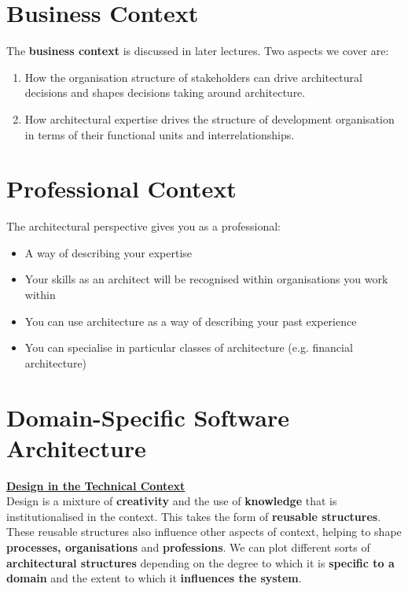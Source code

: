 \documentclass[a4paper]{report}
\begin{document}
\section{Business Context}
The \textbf{business context} is discussed in later lectures. Two aspects we cover are:
\begin{enumerate}
\item How the organisation structure of stakeholders can drive architectural decisions and shapes decisions taking around architecture.
\item How architectural expertise drives the structure of development organisation in terms of their functional units and interrelationships.
\end{enumerate}
\section{Professional Context}
The architectural perspective gives you as a professional:
\begin{itemize}
\item A way of describing your expertise
\item Your skills as an architect will be recognised within organisations you work within
\item You can use architecture as a way of describing your past experience
\item You can specialise in particular classes of architecture (e.g. financial architecture)
\end{itemize}
\section{Domain-Specific Software Architecture}

\underline{\textbf{Design in the Technical Context}}\\
Design is a mixture of \textbf{creativity} and the use of \textbf{knowledge} that is institutionalised in the context. This takes the form of \textbf{reusable structures}. These reusable structures also influence other aspects of context, helping to shape \textbf{processes, organisations} and \textbf{professions}. We can plot different sorts of \textbf{architectural structures} depending on the degree to which it is \textbf{specific to a domain} and the extent to which it \textbf{influences the system}.\\
\end{document}
